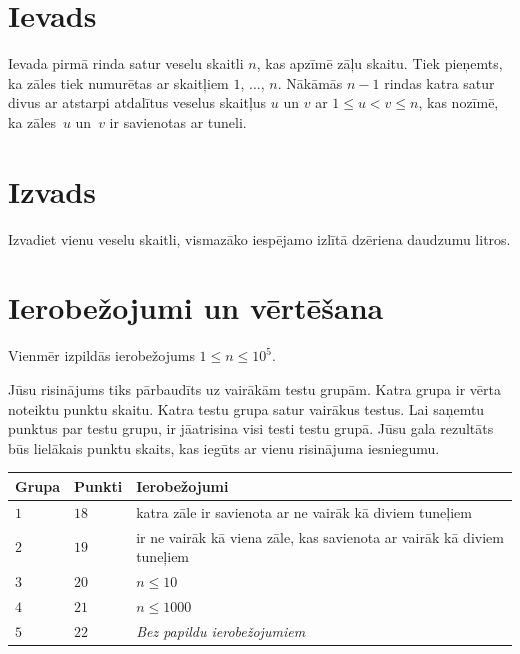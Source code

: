 \section*{Ievads}

Ievada pirmā rinda satur veselu skaitli $n$, kas apzīmē zāļu skaitu.
Tiek pieņemts, ka zāles tiek numurētas ar skaitļiem $1$, $\ldots$, $n$.
Nākāmās $n-1$ rindas katra satur divus ar atstarpi atdalītus veselus skaitļus $u$ un $v$ ar 
$1\leq u < v \leq n$, %
kas nozīmē, ka zāles~$u$ un~$v$ ir savienotas ar tuneli.

\section*{Izvads}

Izvadiet vienu veselu skaitli, vismazāko iespējamo izlītā dzēriena daudzumu litros.

\section*{Ierobežojumi un vērtēšana}

Vienmēr izpildās ierobežojums
$1\leq n\leq 10^5$. %

Jūsu risinājums tiks pārbaudīts uz vairākām testu grupām. Katra grupa ir vērta noteiktu punktu skaitu.
Katra testu grupa satur vairākus testus.
Lai saņemtu punktus par testu grupu, ir jāatrisina visi testi testu grupā.
Jūsu gala rezultāts būs lielākais punktu skaits, kas iegūts ar vienu risinājuma iesniegumu.

\medskip
\begin{tabular}{lll}
Grupa & Punkti & Ierobežojumi \\\hline
  $1$ & $18$ & katra zāle ir savienota ar ne vairāk kā diviem tuneļiem\\
  $2$ & $19$ & ir ne vairāk kā viena zāle, kas savienota ar vairāk kā diviem tuneļiem\\
  $3$ & $20$ & $n\leq 10$\\
  $4$ & $21$ & $n\leq 1000$\\
  $5$ & $22$ & \emph{Bez papildu ierobežojumiem}
\end{tabular}
